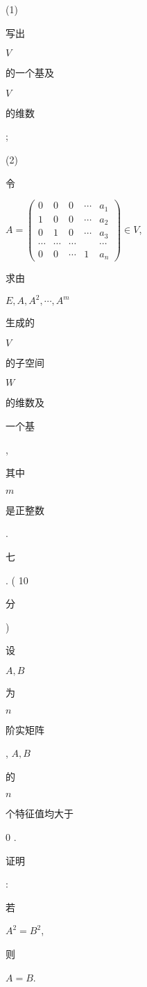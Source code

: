 \documentclass[10pt]{article}
\begin{document}
(1) \begin{CJK}{UTF8}{mj}写出\end{CJK} $V$ \begin{CJK}{UTF8}{mj}的一个基及\end{CJK} $V$ \begin{CJK}{UTF8}{mj}的维数\end{CJK};

(2) \begin{CJK}{UTF8}{mj}令\end{CJK} $A=\left(\begin{array}{ccccc}0 & 0 & 0 & \cdots & a_{1} \\ 1 & 0 & 0 & \cdots & a_{2} \\ 0 & 1 & 0 & \cdots & a_{3} \\ \cdots & \cdots & \cdots & & \cdots \\ 0 & 0 & \cdots & 1 & a_{n}\end{array}\right) \in V$, \begin{CJK}{UTF8}{mj}求由\end{CJK} $E, A, A^{2}, \cdots, A^{m}$ \begin{CJK}{UTF8}{mj}生成的\end{CJK} $V$ \begin{CJK}{UTF8}{mj}的子空间\end{CJK} $W$ \begin{CJK}{UTF8}{mj}的维数及\end{CJK} \begin{CJK}{UTF8}{mj}一个基\end{CJK}, \begin{CJK}{UTF8}{mj}其中\end{CJK} $m$ \begin{CJK}{UTF8}{mj}是正整数\end{CJK}.

\begin{CJK}{UTF8}{mj}七\end{CJK}. ( 10 \begin{CJK}{UTF8}{mj}分\end{CJK}) \begin{CJK}{UTF8}{mj}设\end{CJK} $A, B$ \begin{CJK}{UTF8}{mj}为\end{CJK} $n$ \begin{CJK}{UTF8}{mj}阶实矩阵\end{CJK}, $A, B$ \begin{CJK}{UTF8}{mj}的\end{CJK} $n$ \begin{CJK}{UTF8}{mj}个特征值均大于\end{CJK} 0 . \begin{CJK}{UTF8}{mj}证明\end{CJK}: \begin{CJK}{UTF8}{mj}若\end{CJK} $A^{2}=B^{2}$, \begin{CJK}{UTF8}{mj}则\end{CJK} $A=B$.
\end{document}
